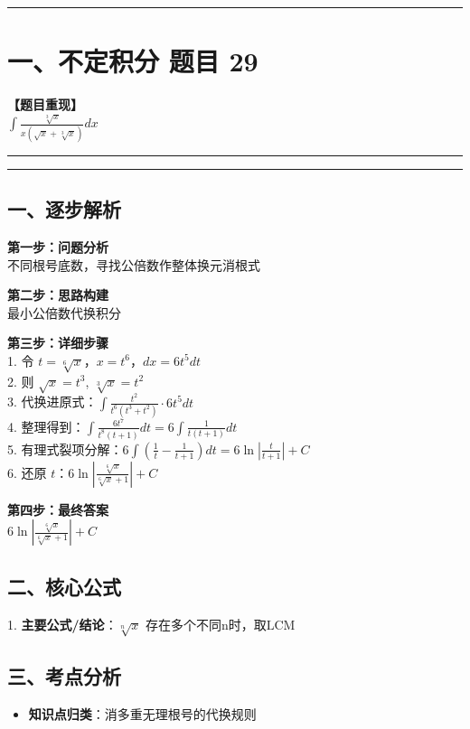 ﻿\documentclass[12pt, a4paper]{ctexart}
\newcommand{\TopSeparator}{
    \par\noindent\rule{\textwidth}{1.5pt}\vspace{0.5em}
}
\newcommand{\AnalysisSeparator}{
    \par\noindent\rule{\textwidth}{0.5pt}\vspace{0.2em}\hrule\vspace{0.5em}
}
\newenvironment{RedAnalysis}{
    \par
    \color{red} 
}{
    \par
    \color{black} 
}
\begin{document}
\vspace{2em}

\TopSeparator
\section*{一、不定积分 题目 29}

\textbf{【题目重现】} \\
$\int \frac{\sqrt[3]{x}}{x(\sqrt{x}+\sqrt[3]{x})} dx$

\AnalysisSeparator

\begin{RedAnalysis}

	\subsection*{一、逐步解析}

	\textbf{第一步：问题分析} \\
	不同根号底数，寻找公倍数作整体换元消根式

	\textbf{第二步：思路构建} \\
	最小公倍数代换积分

	\textbf{第三步：详细步骤} \\
	1. 令 $t = \sqrt[6]{x}$，$x = t^6$，$dx = 6t^5 dt$ \\ 
	2. 则 $\sqrt{x} = t^3$, $\sqrt[3]{x} = t^2$ \\ 
	3. 代换进原式：$\int \frac{t^2}{t^6(t^3+t^2)} \cdot 6t^5 dt$ \\ 
	4. 整理得到：$\int \frac{6t^7}{t^8(t+1)} dt = 6 \int \frac{1}{t(t+1)} dt$ \\ 
	5. 有理式裂项分解：$6 \int (\frac{1}{t} - \frac{1}{t+1}) dt = 6\ln|\frac{t}{t+1}| + C$ \\ 
	6. 还原 $t$：$6 \ln \left| \frac{\sqrt[6]{x}}{\sqrt[6]{x}+1} \right| + C$

	\textbf{第四步：最终答案} \\
	$6 \ln \left| \frac{\sqrt[6]{x}}{\sqrt[6]{x}+1} \right| + C$

	\subsection*{二、核心公式}
	1. \textbf{主要公式/结论}：$\sqrt[n]{x} \text{ 存在多个不同n时，取LCM}$

	\subsection*{三、考点分析}
	\begin{itemize}
		\item \textbf{知识点归类}：消多重无理根号的代换规则
	\end{itemize}

\end{RedAnalysis}
\end{document}

